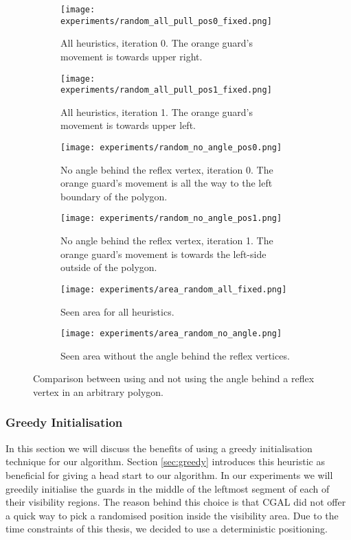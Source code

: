 \begin{figure}[h!]
    \centering
    \begin{subfigure}{0.45\textwidth}
        \texttt{[image: experiments/random\_all\_pull\_pos0\_fixed.png]}
        \caption{All heuristics, iteration 0. The orange guard's movement is towards upper right.}
        \label{fig:all_angle_pos0}
    \end{subfigure}
    \hfill
    \begin{subfigure}{0.45\textwidth}
        \texttt{[image: experiments/random\_all\_pull\_pos1\_fixed.png]}
        \caption{All heuristics, iteration 1. The orange guard's movement is towards upper left.}
        \label{fig:all_angle_pos1}
    \end{subfigure}
    \vfill
    \begin{subfigure}{0.45\textwidth}
        \texttt{[image: experiments/random\_no\_angle\_pos0.png]}
        \caption{No angle behind the reflex vertex, iteration 0. The orange guard's movement is all the way to the left boundary of the polygon.}
        \label{fig:no_angle_pos0}
    \end{subfigure}
    \hfill
    \begin{subfigure}{0.45\textwidth}
        \texttt{[image: experiments/random\_no\_angle\_pos1.png]}
        \caption{No angle behind the reflex vertex, iteration 1. The orange guard's movement is towards the left-side outside of the polygon.}
        \label{fig:no_angle_pos1}
    \end{subfigure}
    \vfill
    \begin{subfigure}{0.45\textwidth}
        \texttt{[image: experiments/area\_random\_all\_fixed.png]}
        \caption{Seen area for all heuristics.}
        \label{fig:area_all_angle}
    \end{subfigure}
    \hfill
    \begin{subfigure}{0.45\textwidth}
        \texttt{[image: experiments/area\_random\_no\_angle.png]}
        \caption{Seen area without the angle behind the reflex vertices.}
        \label{fig:area_no_angle}
    \end{subfigure}
    \caption{Comparison between using and not using the angle behind a reflex vertex in an arbitrary polygon.}
    \label{fig:no_angle}
\end{figure}

\subsubsection{Greedy Initialisation}
In this section we will discuss the benefits of using a greedy initialisation technique for our algorithm. Section \ref{sec:greedy} introduces this heuristic as beneficial for giving a head start to our algorithm. In our experiments we will greedily initialise the guards in the middle of the leftmost segment of each of their visibility regions. The reason behind this choice is that CGAL did not offer a quick way to pick a randomised position inside the visibility area. Due to the time constraints of this thesis, we decided to use a deterministic positioning.

